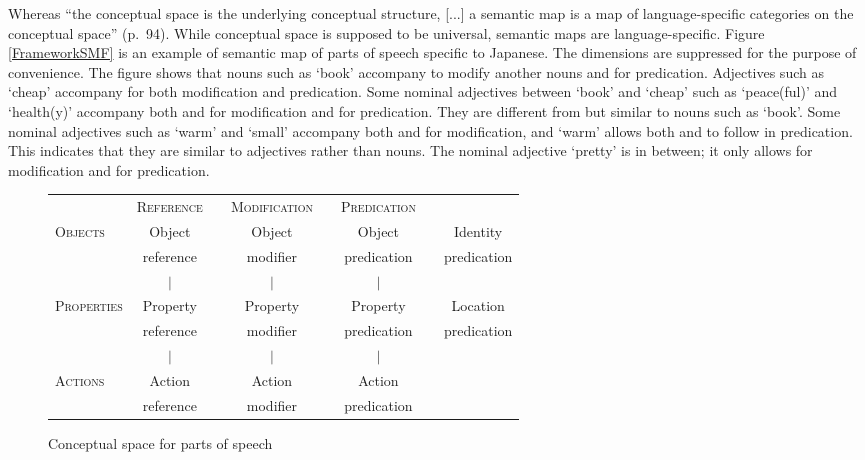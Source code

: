 Whereas
``the conceptual space is the underlying conceptual structure,
[...] a semantic map is a map of language-specific categories on the conceptual space'' (p.\ 94).
While conceptual space is supposed to be universal,
semantic maps are language-specific.
Figure \ref{FrameworkSMF} is an example of semantic map of parts of speech specific to Japanese.
The dimensions are suppressed for the purpose of convenience.
The figure shows that
nouns such as  `book' accompany  to modify another nouns and  for predication. %
Adjectives such as  `cheap' accompany  for both modification and predication. %
Some nominal adjectives between `book' and `cheap' such as  `peace(ful)' and  `health(y)' accompany both  and  for modification and  for predication.
They are different from but similar to nouns such as `book'.
Some nominal adjectives such as  `warm' and  `small' accompany both  and  for modification, and
`warm' allows both  and  to follow in predication.
This indicates that
they are similar to adjectives rather than nouns.
The nominal adjective  `pretty' is in between;
it only allows  for modification and  for predication.

\begin{figure}
 \centering
 \begin{tabular}{lclclclc}
             & \textsc{Reference} &  & \textsc{Modification} &  & \textsc{Predication} & & \\
 \textsc{Objects}     & Object    &  & Object       &  & Object      &  & Identity \\
\hhline{~~-~-~-~}
             & reference &  & modifier     &  & predication &  & predication \\
             & \hfill $|$ \hfill &  &  \hfill $|$ \hfill &  &  \hfill $|$ \hfill &  &  \\
 \textsc{Properties}  & Property  &  & Property     &  & Property    &  & Location \\
\hhline{~~-~-~-~}
             & reference &  & modifier     &  & predication &  & predication \\
             & \hfill $|$ \hfill &  &  \hfill $|$ \hfill &  &  \hfill $|$ \hfill &  &  \\
 \textsc{Actions}     & Action    &  & Action       &  & Action      &  &  \\
\hhline{~~-~-~~~}
             & reference &  & modifier     &  & predication &  &  \\
 \end{tabular}
 \caption{Conceptual space for parts of speech \cite[92]{croft01}}
 \label{FrameworkCSF}
\end{figure}

